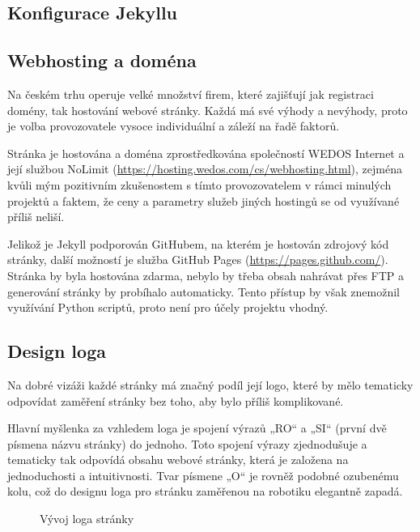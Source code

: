 \documentclass[a4paper, 12pt]{article}
\begin{document}
  \subsection{Konfigurace Jekyllu}

  \subsection{Webhosting a doména} \label{sec:Webhosting a doména}
  Na českém trhu operuje velké množství firem, které zajišťují jak registraci domény, tak hostování webové stránky. Každá má své výhody a nevýhody, proto je volba provozovatele vysoce individuální a záleží na řadě faktorů.

  Stránka je hostována a doména zprostředkována společností WEDOS Internet a její službou NoLimit (\url{https://hosting.wedos.com/cs/webhosting.html}), zejména kvůli mým pozitivním zkušenostem s tímto provozovatelem v rámci minulých projektů a faktem, že ceny a parametry služeb jiných hostingů se od využívané příliš neliší.

  Jelikož je Jekyll podporován GitHubem, na kterém je hostován zdrojový kód stránky, další možností je služba GitHub Pages (\url{https://pages.github.com/}). Stránka by byla hostována zdarma, nebylo by třeba obsah nahrávat přes FTP a generování stránky by probíhalo automaticky. Tento přístup by však znemožnil využívání Python scriptů, proto není pro účely projektu vhodný.


  \subsection{Design loga}
  Na dobré vizáži každé stránky má značný podíl její logo, které by mělo tematicky odpovídat zaměření stránky bez toho, aby bylo příliš komplikované.

  Hlavní myšlenka za vzhledem loga je spojení výrazů „RO“ a „SI“ (první dvě písmena názvu stránky) do jednoho. Toto spojení výrazy zjednodušuje a tematicky tak odpovídá obsahu webové stránky, která je založena na jednoduchosti a intuitivnosti. Tvar písmene „O“ je rovněž podobné ozubenému kolu, což do designu loga pro stránku zaměřenou na robotiku elegantně zapadá.

  \begin{figure}[H]%
    \centering

    \hfill
    \hfill

    \caption{Vývoj loga stránky}%
    \label{img:Vývoj loga stránky}%
  \end{figure}
\end{document}

